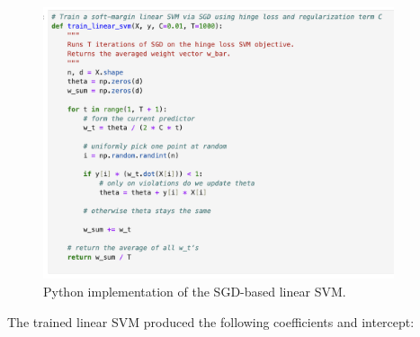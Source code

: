 \documentclass[12pt]{article}
\begin{document}
\begin{figure}[H]
    \centering
    \includegraphics[width=0.92\textwidth]{./linear-svm-training-procedure.png}
    \caption{Python implementation of the SGD-based linear SVM.}
    \label{fig:sgd}
\end{figure}

The trained linear SVM produced the following coefficients and intercept:
\end{document}

